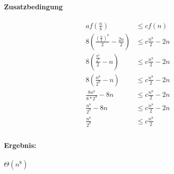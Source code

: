 \documentclass[12pt,letterpaper]{article}
\begin{document}
\paragraph{Zusatzbedingung}
\begin{align}
    a f(\frac{n}{b})                              & \leq c f(n)               \\
    8(\frac{(\frac{n}{2})^8}{2}  - \frac{2n}{2} ) & \leq c \frac{n^8}{2} - 2n \\
    8(\frac{\frac{n^8}{2^8}}{2}  - n )            & \leq c \frac{n^8}{2} - 2n \\
    8(\frac{n^8}{2^9}  - n )                      & \leq c \frac{n^8}{2} - 2n \\
    \frac{8n^8}{8*2^9}  - 8n                      & \leq c \frac{n^8}{2} - 2n \\
    \frac{n^8}{2^9}  - 8n                         & \leq c \frac{n^8}{2} - 2n \\
    \frac{n^8}{2^9}                               & \leq c \frac{n^8}{2}      \\
\end{align}

\paragraph{Ergebnis:}
$ \Theta(n^8)$
\end{document}
